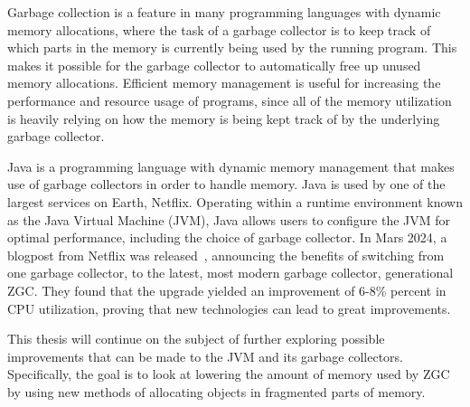 
Garbage collection is a feature in many programming languages with dynamic memory allocations, where the task of a garbage collector is to keep track of which parts in the memory is currently being used by the running program. This makes it possible for the garbage collector to automatically free up unused memory allocations. Efficient memory management is useful for increasing the performance and resource usage of programs, since all of the memory utilization is heavily relying on how the memory is being kept track of by the underlying garbage collector.

Java is a programming language with dynamic memory management that makes use of garbage collectors in order to handle memory. Java is used by one of the largest services on Earth, Netflix. Operating within a runtime environment known as the Java Virtual Machine (JVM), Java allows users to configure the JVM for optimal performance, including the choice of garbage collector. In Mars 2024, a blogpost from Netflix was released~\cite{netflix:zgc}, announcing the benefits of switching from one garbage collector, to the latest, most modern garbage collector, generational ZGC. They found that the upgrade yielded an improvement of 6-8\% percent in CPU utilization, proving that new technologies can lead to great improvements.

This thesis will continue on the subject of further exploring possible improvements that can be made to the JVM and its garbage collectors. Specifically, the goal is to look at lowering the amount of memory used by ZGC by using new methods of allocating objects in fragmented parts of memory. 